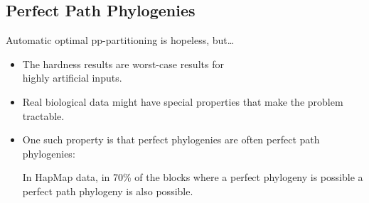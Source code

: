 \documentclass[aspectratio=1610]{beamer}
\begin{document}
\subsection{Perfect Path Phylogenies}

\begin{frame}{Automatic optimal pp-partitioning is hopeless, but\dots}
  \begin{itemize}
  \item The hardness results are \alert{worst-case} results for\\
    \alert{highly artificial inputs}.
  \item \alert{Real biological data} might have special properties
    that make the problem \alert{tractable}.
  \item One such property is that perfect phylogenies are often
    perfect \alert{path} phylogenies:

    In HapMap data, in 70\% of the blocks where a perfect phylogeny
    is possible a perfect path phylogeny is also possible.
  \end{itemize}  
\end{frame}
\end{document}
